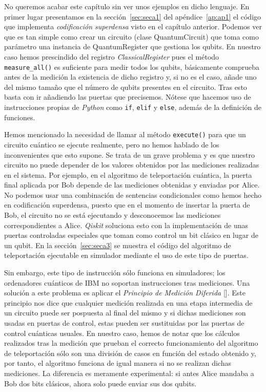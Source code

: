 No queremos acabar este capítulo sin ver unos ejemplos en dicho lenguaje. En primer lugar presentamos en la sección~\ref{sec:seca1} del apéndice~\ref{ap:ap1} el código que implementa \textit{codificación superdensa} visto en el capítulo anterior. Podemos ver que es tan simple como crear un circuito (clase QuantumCircuit) que toma como parámetro una instancia de QuantumRegister que gestiona los qubits. En nuestro caso hemos prescindido del registro \textit{ClassicalRegister} pues el método \texttt{measure\_all()} es suficiente para medir todos los qubits, básicamente comprueba antes de la medición la existencia de dicho registro y, si no es el caso, añade uno del mismo tamaño que el número de qubits presentes en el circuito. Tras esto basta con ir añadiendo las puertas que precisemos. Nótese que hacemos uso de instrucciones propias de \textit{Python} como \texttt{if}, \texttt{elif} y \texttt{else}, además de la definición de funciones.

Hemos mencionado la necesidad de llamar al método \texttt{execute()} para que un circuito cuántico se ejecute realmente, pero no hemos hablado de los inconvenientes que esto supone. Se trata de un grave problema y es que nuestro circuito no puede depender de los valores obtenidos por las mediciones realizadas en el sistema. Por ejemplo, en el algoritmo de teleportación cuántica, la puerta final aplicada por Bob depende de las mediciones obtenidas y enviadas por Alice. No podemos usar una combinación de sentencias condicionales como hemos hecho en codificación superdensa, puesto que en el momento de insertar la puerta de Bob, el circuito no se está ejecutando y desconocemos las mediciones correspondientes a Alice. \textit{Qiskit} soluciona esto con la implementación de unas puertas controladas especiales que toman como control un bit clásico en lugar de un qubit. En la sección~\ref{sec:seca3} se muestra el código del algoritmo de teleportación ejecutable en simulador mediante el uso de este tipo de puertas.

Sin embargo, este tipo de instrucción sólo funciona en simuladores; los ordenadores cuánticos de IBM no soportan instrucciones tras mediciones. Una solución a este problema es aplicar el \textit{Principio de Medición Diferida} [\cite{nielsen2001quantum}]. Este principio nos dice que cualquier medición realizada en una etapa intermedia de un circuito puede ser pospuesta al final del mismo y si dichas mediciones son usadas en puertas de control, estas pueden ser sustituidas por las puertas de control cuánticas usuales. En nuestro caso, hemos de notar que los cálculos realizados tras la medición que prueban el correcto funcionamiento del algoritmo de teleportación sólo son una división de casos en función del estado obtenido y, por tanto, el algoritmo funciona de igual manera si no se realizan dichas mediciones. La diferencia es meramente experimental: si antes Alice mandaba a Bob dos bits clásicos, ahora solo puede enviar sus dos qubits.